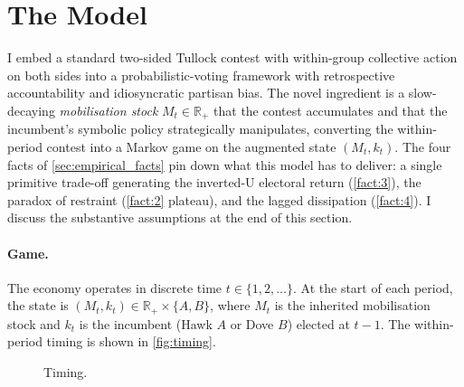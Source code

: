 \documentclass[11pt,twoside]{extarticle}
\begin{document}

\section{The Model}\label{sec:model_v3}

I embed a standard two-sided Tullock contest \citep*{skaperdasContestSuccessFunctions1996,jiaStochasticDerivationRatio2008} with within-group collective action on both sides into a probabilistic-voting framework with retrospective accountability \citep*{barroControlPoliticiansEconomic1973,ferejohnIncumbentPerformanceElectoral1986} and idiosyncratic partisan bias. The novel ingredient is a slow-decaying \emph{mobilisation stock} $M_t\in\mathbb R_+$ that the contest accumulates and that the incumbent's symbolic policy strategically manipulates, converting the within-period contest into a Markov game on the augmented state $(M_t,k_t)$. The four facts of \autoref{sec:empirical_facts} pin down what this model has to deliver: a single primitive trade-off generating the inverted-U electoral return (\autoref{fact:3}), the paradox of restraint (\autoref{fact:2} plateau), and the lagged dissipation (\autoref{fact:4}). I discuss the substantive assumptions at the end of this section.

\paragraph{Game.} The economy operates in discrete time $t\in\{1,2,\dots\}$. At the start of each period, the state is $(M_t,k_t)\in\mathbb R_+\times\{A,B\}$, where $M_t$ is the inherited mobilisation stock and $k_t$ is the incumbent (Hawk $A$ or Dove $B$) elected at $t-1$. The within-period timing is shown in \autoref{fig:timing}.

\begin{figure}[H]
\centering
{}
\caption{Timing.}
\label{fig:timing}
\end{figure}
\end{document}
